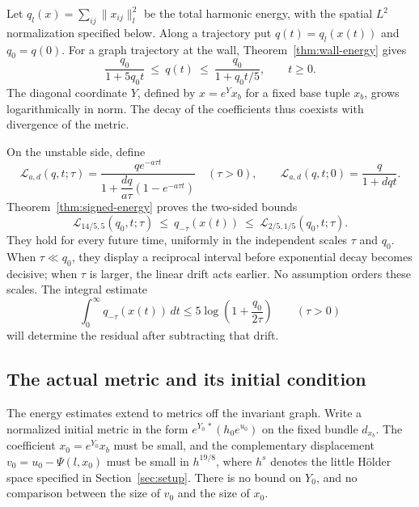 \documentclass[11pt]{amsart}
\theoremstyle{definition}
\theoremstyle{remark}
\begin{document}
Let $q_l(x)=\sum_{ij}\|x_{ij}\|_l^2$ be the total harmonic
energy, with the spatial $L^2$ normalization specified below.
Along a trajectory put $q(t)=q_l(x(t))$ and $q_0=q(0)$.
For a graph trajectory at the wall, Theorem~\ref{thm:wall-energy}
gives
\begin{equation}\label{eq:intro-wall}
 \frac{q_0}{1+5q_0t}\ \le\ q(t)\
             \le\ \frac{q_0}{1+q_0t/5},
 \qquad t\ge0 .
\end{equation}
The diagonal coordinate $Y$, defined by $x=e^Yx_b$
for a fixed base tuple $x_b$, grows logarithmically in norm.
The decay of the coefficients thus coexists with divergence
of the metric.

On the unstable side, define
\[
 \mathcal L_{a,d}(q,t;\tau)=
 \frac{q e^{-a\tau t}}
 {1+\dfrac{dq}{a\tau}(1-e^{-a\tau t})}\quad(\tau>0),
 \qquad
 \mathcal L_{a,d}(q,t;0)=\frac{q}{1+dqt}.
\]
Theorem~\ref{thm:signed-energy} proves the two-sided bounds
\begin{equation}\label{eq:intro-transition}
 \mathcal L_{14/5,5}(q_0,t;\tau)
 \ \le\ q_{-\tau}(x(t))\
 \le\ \mathcal L_{2/5,1/5}(q_0,t;\tau).
\end{equation}
They hold for every future time, uniformly in the independent
scales $\tau$ and $q_0$. When $\tau\ll q_0$, they display a
reciprocal interval before exponential decay becomes decisive;
when $\tau$ is larger, the linear drift acts earlier. No
assumption orders these scales. The integral estimate
\begin{equation}\label{eq:intro-integral}
 \int_0^\infty q_{-\tau}(x(t))\,dt
       \le5\log\left(1+\frac{q_0}{2\tau}\right)
       \qquad(\tau>0)
\end{equation}
will determine the residual after subtracting that drift.

\subsection{The actual metric and its initial condition}
The energy estimates extend to metrics off the invariant
graph. Write a normalized initial metric in the form
$e^{Y_0\,*}(h_0e^{u_0})$ on the fixed bundle $d_{x_b}$.
The coefficient $x_0=e^{Y_0}x_b$ must be small, and the
complementary displacement
$v_0=u_0-\Psi(l,x_0)$ must be small in $h^{19/8}$, where
$h^s$ denotes the little H\"older space specified in
Section~\ref{sec:setup}.
There is no bound on $Y_0$, and no comparison between
the size of $v_0$ and the size of $x_0$.
\end{document}

